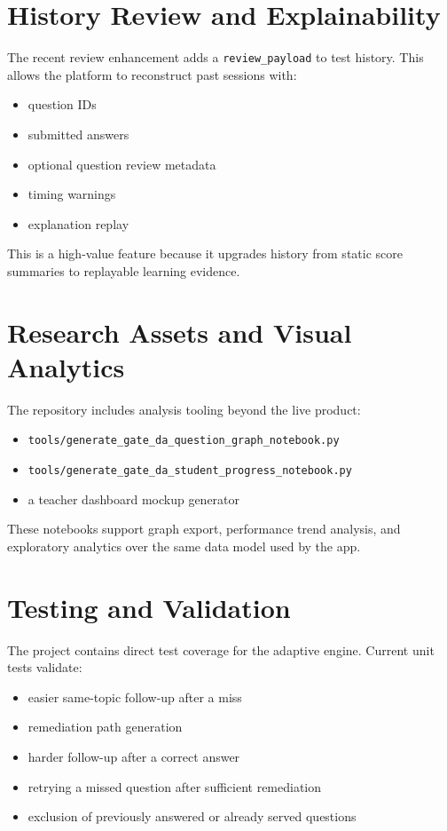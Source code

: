 \documentclass[10pt,twocolumn,a4paper]{article}
\newcommand{\tech}[1]{\texttt{#1}}
\begin{document}
\section{History Review and Explainability}
The recent review enhancement adds a \tech{review\_payload} to test history. This allows the platform to reconstruct past sessions with:

\begin{itemize}
  \item question IDs
  \item submitted answers
  \item optional question review metadata
  \item timing warnings
  \item explanation replay
\end{itemize}

This is a high-value feature because it upgrades history from static score summaries to replayable learning evidence.

\section{Research Assets and Visual Analytics}
The repository includes analysis tooling beyond the live product:

\begin{itemize}
  \item \tech{tools/generate\_gate\_da\_question\_graph\_notebook.py}
  \item \tech{tools/generate\_gate\_da\_student\_progress\_notebook.py}
  \item a teacher dashboard mockup generator
\end{itemize}

These notebooks support graph export, performance trend analysis, and exploratory analytics over the same data model used by the app.

\section{Testing and Validation}
The project contains direct test coverage for the adaptive engine. Current unit tests validate:

\begin{itemize}
  \item easier same-topic follow-up after a miss
  \item remediation path generation
  \item harder follow-up after a correct answer
  \item retrying a missed question after sufficient remediation
  \item exclusion of previously answered or already served questions
\end{itemize}
\end{document}
